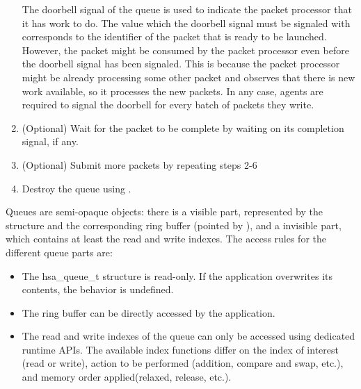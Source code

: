 \documentclass[final]{book}
\begin{document}
\begin{enumerate}[itemsep=1pt,topsep=3pt,partopsep=0pt]
  The doorbell signal of the queue is used to indicate the packet processor that
it has work to do. The value which the doorbell signal must be signaled with
corresponds to the identifier of the packet that is ready to be launched.
However, the packet might be consumed by the packet processor even
before the doorbell signal has been signaled. This is because the packet
processor might be already processing some other packet and observes that there
is new work available, so it processes the new packets. In any case, agents are
required to signal the doorbell for every batch of packets they write.

\item (Optional) Wait for the packet to be complete by waiting on its completion
  signal, if any.

\item (Optional) Submit more packets by repeating steps 2-6

\item Destroy the queue using .
\end{enumerate}

Queues are semi-opaque objects: there is a visible part, represented by the
 structure and the corresponding ring buffer (pointed by
), and a invisible part, which contains at
least the read and write indexes. The access rules for the different queue parts
are:
\begin{itemize}[itemsep=1pt,topsep=3pt,partopsep=0pt]
\item The {hsa_queue_t} structure is read-only. If the application overwrites
  its contents, the behavior is undefined.
\item The ring buffer can be directly accessed by the application.
\item The read and write indexes of the queue can only be accessed using
  dedicated runtime APIs.  The available index functions differ on the index of
  interest (read or write), action to be performed (addition, compare and swap,
  etc.), and memory order applied(relaxed, release, etc.).
\end{itemize}


\end{document}
